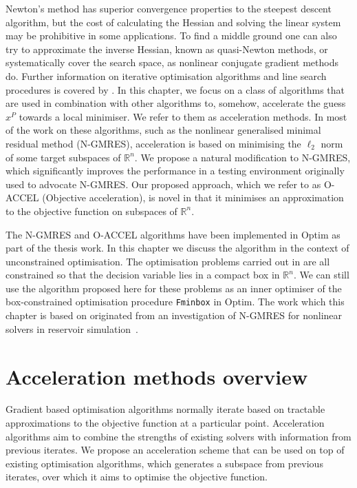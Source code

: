 \documentclass[main.tex]{subfiles}
\begin{document}
Newton's method has superior convergence properties to the steepest
descent algorithm, but the cost of calculating the
Hessian and solving the linear system may be prohibitive in some applications.  To find a middle
ground one can also try to approximate the inverse Hessian, known as
quasi-Newton methods, or systematically cover the search space,
as nonlinear conjugate gradient methods do.  Further information on
iterative optimisation algorithms and line search procedures is covered by
\citet{nocedal2006numerical}.  In this chapter, we focus on a
class of algorithms that are used in combination with other algorithms
to, somehow, accelerate the guess $x^P$ towards a local minimiser.  We
refer to them as acceleration methods.  In most of the work on these
algorithms, such as the nonlinear generalised minimal residual method
(N-GMRES), acceleration is based on minimising the $\ell_2$ norm of
some target subspaces of $\mathbb{R}^n$.  We propose a natural
modification to N-GMRES, which significantly improves the performance
in a testing environment originally used to advocate N-GMRES.  Our
proposed approach, which we refer to as O-ACCEL (Objective
acceleration), is novel in that it minimises an approximation to the
objective function on subspaces of $\mathbb{R}^n$.


The N-GMRES and O-ACCEL algorithms have been implemented in
Optim \citep{mogensen2018optim} as part of the thesis work. In this
chapter we discuss the algorithm in the context of unconstrained
optimisation. The optimisation problems carried out in
 are all
constrained so that the decision variable lies in a compact box in
$\mathbb{R}^n$. We can still use the algorithm proposed here for these
problems as an inner optimiser of the box-constrained optimisation
procedure \texttt{Fminbox} in Optim.  The work which this chapter
is based on
originated
from an investigation of N-GMRES for nonlinear solvers in reservoir
simulation~\citep{riseth2015nonlinear}.


\section{Acceleration methods overview}
Gradient based optimisation algorithms normally iterate based on
tractable approximations to the objective function at a particular
point.
Acceleration algorithms aim to combine the strengths of existing
solvers with information from previous iterates.  We propose an
acceleration scheme that can be used on top of existing optimisation
algorithms, which generates a subspace from previous iterates, over
which it aims to optimise the objective function.
\end{document}
